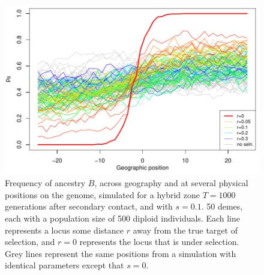 \begin{figure}
\includegraphics{figs/alleleFrequencies_sim_s1_tau1000.pdf}
\caption{
    Frequency of ancestry $B$,
    across geography and at several physical positions on the genome, simulated for a hybrid zone
     $T=1000$ generations after secondary contact,
    and with $s=0.1$.
        50 demes, each with a population size of 500 diploid individuals.
    Each line represents a locus some distance $r$ away from the true target of selection, 
    and $r=0$ represents the locus that is under selection. Grey lines represent the same positions from a simulation with
    identical parameters except that $s=0$.
 }\label{alleleFreq_tau1000}
\end{figure}



